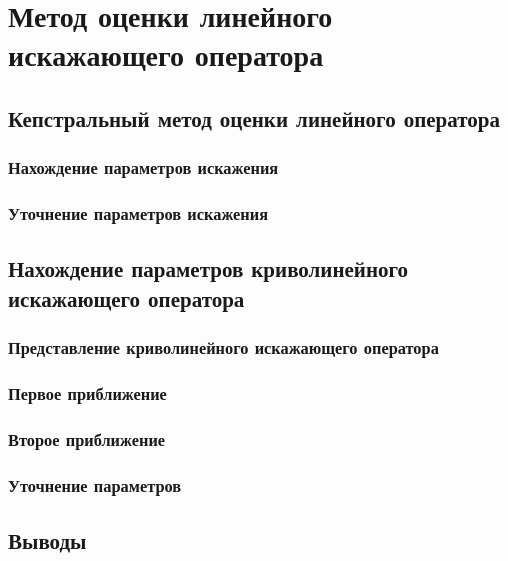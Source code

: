 \chapter{Метод оценки линейного искажающего оператора}

\section{Кепстральный метод оценки линейного оператора}
\subsection{Нахождение параметров искажения}
\subsection{Уточнение параметров искажения}

\section{Нахождение параметров криволинейного искажающего оператора}
\subsection{Представление криволинейного искажающего оператора}
\subsection{Первое приближение}
\subsection{Второе приближение}
\subsection{Уточнение параметров}
\section{Выводы}
